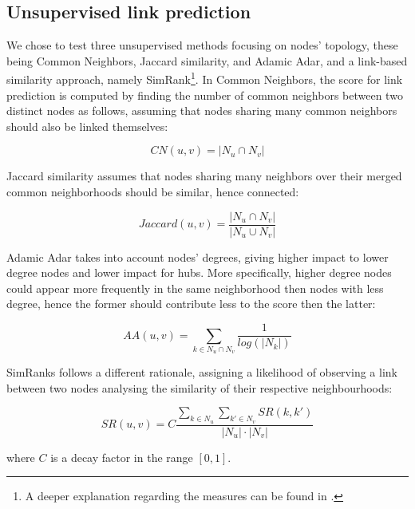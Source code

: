 \documentclass[sigchi]{acmart}
\begin{document}
\subsection{Unsupervised link prediction}
We chose to test three unsupervised methods focusing on nodes' topology, these being Common Neighbors, Jaccard similarity, and Adamic Adar, and a link-based similarity approach, namely SimRank\footnote{A deeper explanation regarding the measures can be found in \cite{nowellklein}.}. In Common Neighbors, the score for link prediction is computed by finding the number of common neighbors between two distinct nodes as follows, assuming that nodes sharing many common neighbors should also be linked themselves:

\begin{equation}
    CN(u,v) = |{N_u\cap N_v}|
\end{equation}

Jaccard similarity assumes that nodes sharing many neighbors over their merged common neighborhoods should be similar, hence connected:

\begin{equation}
    Jaccard(u,v) = \frac{|N_u\cap N_v|}{{|N_u\cup  N_v|}}
\end{equation}

Adamic Adar takes into account nodes' degrees, giving higher impact to lower degree nodes and lower impact for hubs. More specifically, higher degree nodes could appear more frequently in the same neighborhood then nodes with less degree, hence the former should contribute less to the score then the latter:

\begin{equation}
    AA(u,v) = \sum _{k\in{N_u}\cap {N_v}}\frac{1}{log(|N_k|)}
\end{equation}

SimRanks follows a different rationale, assigning a likelihood of observing a link between two nodes analysing the similarity of their respective neighbourhoods:

\begin{equation}
    SR(u,v) = C \frac{\sum_{k\in{N_u}}\sum_{k'\in{N_v}}SR(k,k')}{|N_u|\cdot |N_v|}
\end{equation}

where $C$ is a decay factor in the range $[0,1]$.
\end{document}
